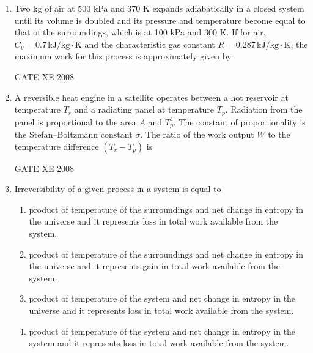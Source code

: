 \documentclass[12pt]{article}
\begin{document}
\begin{enumerate}
\item  Two kg of air at 500 kPa and 370 K expands adiabatically in a closed system until its volume is doubled and its pressure and temperature become equal to that of the surroundings, which is at 100 kPa and 300 K. If for air, $C_v = 0.7 \, \mathrm{kJ/kg \cdot K}$ and the characteristic gas constant $R = 0.287 \, \mathrm{kJ/kg \cdot K}$, the maximum work for this process is approximately given by

\begin{enumerate}
\end{enumerate}

GATE XE 2008

\item  A reversible heat engine in a satellite operates between a hot reservoir at temperature $T_r$ and a radiating panel at temperature $T_p$. Radiation from the panel is proportional to the area $A$ and $T_p^4$. The constant of proportionality is the Stefan–Boltzmann constant $\sigma$. The ratio of the work output $W$ to the temperature difference $(T_r - T_p)$ is  

\begin{enumerate}
\end{enumerate}

GATE XE 2008

\item Irreversibility of a given process in a system is equal to  

\begin{enumerate}
\item  product of temperature of the surroundings and net change in entropy in the universe and it represents loss in total work available from the system.  
 \item  product of temperature of the surroundings and net change in entropy in the universe and it represents gain in total work available from the system.  
 \item  product of temperature of the system and net change in entropy in the universe and it represents loss in total work available from the system. 
  \item  product of temperature of the system and net change in entropy in the system and it represents loss in total work available from the system.
 \end{enumerate}
 

\end{enumerate}
\end{document}
